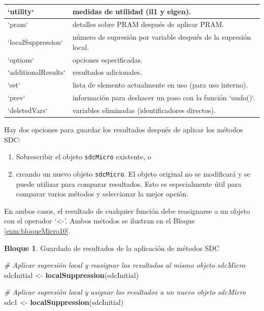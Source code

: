 \documentclass[]{book}
\newenvironment{Shaded}{\begin{snugshade}}{\end{snugshade}}
\newcommand{\CommentTok}[1]{\textcolor[rgb]{0.56,0.35,0.01}{\textit{#1}}}
\newcommand{\KeywordTok}[1]{\textcolor[rgb]{0.13,0.29,0.53}{\textbf{#1}}}
\newcommand{\NormalTok}[1]{#1}
\newcommand{\StringTok}[1]{\textcolor[rgb]{0.31,0.60,0.02}{#1}}
\providecommand{\tightlist}{%
  \setlength{\itemsep}{0pt}\setlength{\parskip}{0pt}}
\theoremstyle{definition}
\theoremstyle{definition}
\newtheorem{example}{Bloque}[chapter]
\theoremstyle{definition}
\theoremstyle{definition}
\theoremstyle{remark}
\begin{document}
\begin{table}
\begin{tabular}[t]{l|l}
\hline
`utility` & medidas de utilidad (il1 y eigen).\\
\hline
`pram` & detalles sobre PRAM después de aplicar PRAM.\\
\hline
`localSuppression` & número de supresión por variable después de la supresión local.\\
\hline
`options` & opciones especificadas.\\
\hline
`additionalResults` & resultados adicionales.\\
\hline
`set` & lista de elemento actualmente en uso (para uso interno).\\
\hline
`prev` & información para deshacer un paso con la función `undo()`.\\
\hline
`deletedVars` & variables eliminadas (identificadores directos).\\
\hline
\end{tabular}
\end{table}

Hay dos opciones para guardar los resultados después de aplicar los métodos SDC:

\begin{enumerate}
\def\labelenumi{\arabic{enumi}.}
\tightlist
\item
  Sobrescribir el objeto \texttt{sdcMicro} existente, o
\item
  creando un nuevo objeto \texttt{sdcMicro}. El objeto original no se modificará y se puede utilizar para comparar resultados. Esto es especialmente útil para comparar varios métodos y seleccionar la mejor opción.
\end{enumerate}

En ambos casos, el resultado de cualquier función debe reasignarse a un objeto con el operador `\textless{}-'. Ambos métodos se ilustran en el Bloque \ref{exm:bloqueMicro10}.

\begin{example}
\protect\hypertarget{exm:bloqueMicro10}{}{\label{exm:bloqueMicro10} }Guardado de resultados de la aplicación de métodos SDC
\end{example}

\begin{Shaded}
\begin{Highlighting}[]
\CommentTok{# Aplicar supresión local y reasignar los resultados al mismo objeto sdcMicro}
\NormalTok{sdcInitial <-}\StringTok{ }\KeywordTok{localSuppression}\NormalTok{(sdcInitial)}

\CommentTok{# Aplicar supresión local y asignar los resultados a un nuevo objeto sdcMicro}
\NormalTok{sdc1 <-}\StringTok{ }\KeywordTok{localSuppression}\NormalTok{(sdcInitial)}
\end{Highlighting}
\end{Shaded}
\end{document}
